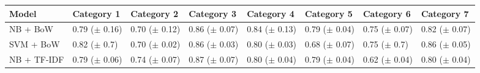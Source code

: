 \documentclass[a4paper,twoside,phd]{BYUPhys}
\begin{document}
\begin{table}[H]
	\centering
	\begin{tabular}{|p{1.7cm}|p{1.6cm}|p{1.6cm}|p{1.6cm}|p{1.6cm}|p{1.6cm}|p{1.6cm}|p{1.6cm}|}
		\hline
		Model & Category 1                                                                           & Category 2    & Category 3 & Category 4 & Category 5 & Category 6 & Category 7                                                                                                                                                                                                                                                                                                                                                          \\
		\hline
		NB + BoW  & 0.79 \newline ($\pm$ 0.16) & 0.70 \newline ($\pm$ 0.12) & 0.86 \newline ($\pm$ 0.07) & 0.84 \newline ($\pm$ 0.13) & 0.79 \newline ($\pm$ 0.04)  & 0.75 \newline ($\pm$ 0.07)  & 0.82 \newline ($\pm$ 0.07)   \\
		\hline
		
		SVM + BoW  & 0.82 \newline ($\pm$ 0.7) & 0.70 \newline ($\pm$ 0.02) & 0.86 \newline ($\pm$ 0.03) & 0.80 \newline ($\pm$ 0.03) & 0.68 \newline ($\pm$ 0.07)  & 0.75 \newline ($\pm$ 0.7)  & 0.86 \newline ($\pm$ 0.05)                                                                                                                                             \\
		\hline                                                                                                                                                                                                                
				
		NB + TF-IDF  & 0.79 \newline ($\pm$ 0.06) & 0.74 \newline ($\pm$ 0.07) & 0.87 \newline ($\pm$ 0.07) & 0.80 \newline ($\pm$ 0.04) & 0.79 \newline ($\pm$ 0.04)  & 0.62 \newline ($\pm$ 0.04)  & 0.80 \newline ($\pm$ 0.04)  \\
		\hline
		

\end{tabular}
\end{table}
\end{document}
